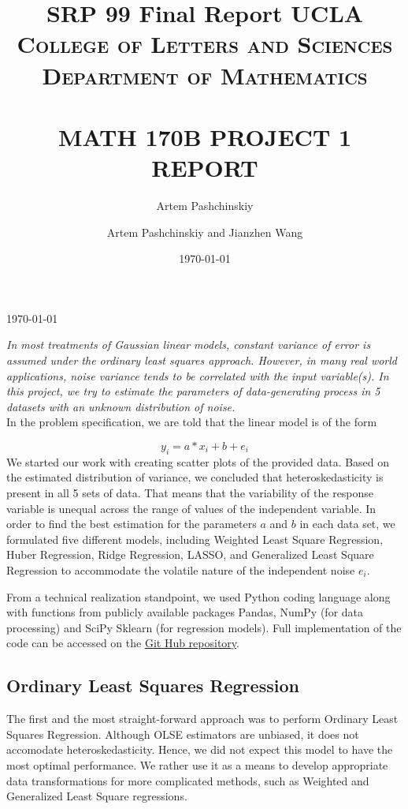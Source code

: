 \documentclass[letter,12pt]{article} %
\author{Artem Pashchinskiy}
\title{SRP 99 Final Report}
\date{\today}
\title{ \normalsize \textsc{UCLA College of Letters and Sciences \\ Department of Mathematics}  %
	\\[2.0cm]                                                   %
	\HRule{0.5pt} \\                                        %
	\LARGE \textbf{\uppercase{Math 170B Project 1 Report}}   %
	\HRule{2pt} \\ [0.5cm]                              %
	\printauthor                                    %
}
\author{
	Artem Pashchinskiy and Jianzhen Wang
}
\makeatletter
\def\printtitle{%
	{\centering \@title\par}}
\makeatother
\begin{document}
	\thispagestyle{empty}               %
	
	\printtitle                                 %
	\vfill
	\begin{center} \today \end{center}
	
	\newpage
	
	\textit{In most treatments of Gaussian linear models, constant variance of error is assumed under the ordinary least squares approach. However, in many real world applications, noise variance tends to be correlated with the input variable(s). In this project, we try to estimate the parameters of data-generating process in 5 datasets with an unknown distribution of noise. }\\
	
	In the problem specification, we are told that the linear model is of the form 
	
	$$y_i = a*x_i + b + e_i$$
	We started our work with creating scatter plots of the provided data. Based on the estimated distribution of variance,  we concluded that  heteroskedasticity is present in all 5 sets of data. That means that the variability of the response variable is unequal across the range of values of the independent variable. In order to find the best estimation for the parameters $a$ and $b$ in each data set, we formulated five different models, including Weighted Least Square Regression, Huber Regression, Ridge Regression, LASSO, and Generalized Least Square Regression to accommodate the volatile nature of the independent noise $e_i$.
	
	From a technical realization standpoint, we used Python coding language along with functions from publicly available packages Pandas, NumPy (for data processing) and SciPy Sklearn (for regression models). Full implementation of the code can be accessed on the \href{https://github.com/apashch/Heterosked-reg-models}{\underline{Git Hub repository}}.
	
	\subsection*{Ordinary Least Squares Regression}
	The first and the most straight-forward approach was to perform Ordinary Least Squares Regression. Although OLSE estimators are unbiased, it does not accomodate heteroskedasticity. Hence, we did not expect this model to have the most optimal performance. We rather use it as a means to develop appropriate data transformations for more complicated methods, such as Weighted and Generalized Least Square regressions.
	
\end{document}
